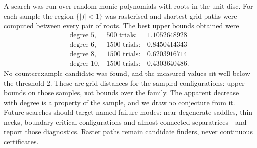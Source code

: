 A search was run over random monic polynomials with roots in the unit disc.  For
each sample the region $\{|f|<1\}$ was rasterised and shortest grid paths were
computed between every pair of roots.  The best upper bounds obtained were
\[
  \begin{array}{lrr}
    \text{degree } 5, & 500 \text{ trials}: & 1.1052648928\\
    \text{degree } 6, & 1500 \text{ trials}: & 0.8450414343\\
    \text{degree } 8, & 1500 \text{ trials}: & 0.6203916714\\
    \text{degree } 10, & 1500 \text{ trials}: & 0.4303640486 .
  \end{array}
\]
No counterexample candidate was found, and the measured values sit well below
the threshold $2$.  These are grid distances for the sampled configurations:
upper bounds on those samples, not bounds over the family.  The apparent
decrease with degree is a property of the sample, and we draw no conjecture from
it.
Future searches should target named failure modes: near-degenerate saddles,
thin necks, boundary-critical configurations and almost-connected
separatrices---and report those diagnostics.  Raster paths remain candidate
finders, never continuous certificates.
